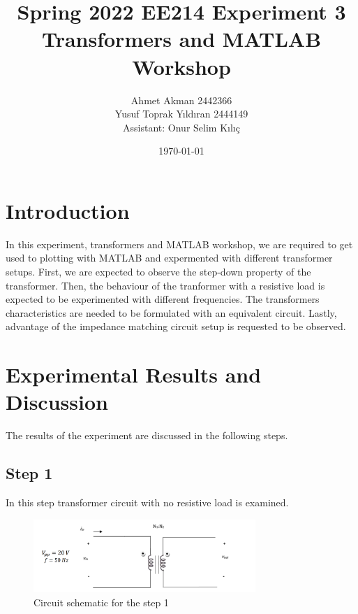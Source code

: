 \documentclass[letterpaper,12pt]{article}
\begin{document}
\thispagestyle{empty}

\title{Spring 2022 EE214 Experiment 3  \protect\\ Transformers and MATLAB Workshop }
\author{Ahmet Akman 2442366 \protect\\ Yusuf Toprak Yıldıran 2444149 \protect\\ Assistant: Onur Selim Kılıç}
\date{\today}
\maketitle
\tableofcontents
\section{Introduction}
In this experiment, transformers and MATLAB workshop, we are required to get used to plotting with MATLAB and expermented with different transformer setups. First, we are expected to observe the step-down property of the transformer. Then, the behaviour of the tranformer with a resistive load is expected to be experimented with different frequencies. The transformers characteristics are needed to be formulated with an equivalent circuit. Lastly, advantage of the impedance matching circuit setup is requested to be observed.
\section{Experimental Results and Discussion}
The results of the experiment are discussed in the following steps.
%
\subsection{Step 1}
In this step transformer circuit with no resistive load is examined. 
\begin{figure}[H]
    \centering
    \includegraphics[width = 0.75\textwidth]{1.png}
    \caption{Circuit schematic for the step 1}
\end{figure} 
    
\end{document}
